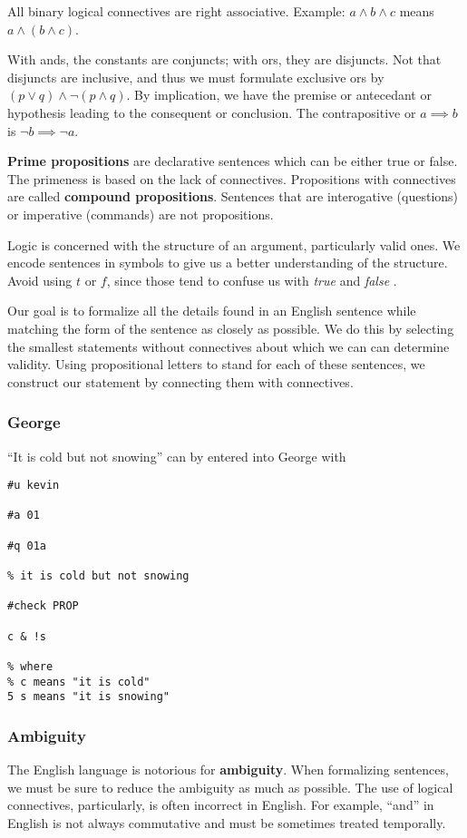\documentclass[12pt]{article}
\begin{document}
All binary logical connectives are right associative. Example: $a \land b \land c$ means $a \land (b \land c)$.

With ands, the constants are conjuncts; with ors, they are disjuncts. Not that disjuncts are inclusive, and thus we must formulate exclusive ors by $(p \lor q) \land \neg (p \land q)$. By implication, we have the premise or antecedant or hypothesis leading to the consequent or conclusion. The contrapositive or $a \implies b$ is $\neg b \implies \neg a$.

{\bf Prime propositions} are declarative sentences which can be either true or false. The primeness is based on the lack of connectives. Propositions with connectives are called {\bf compound propositions}. Sentences that are interogative (questions) or imperative (commands) are not propositions.

Logic is concerned with the structure of an argument, particularly valid ones. We encode sentences in symbols to give us a better understanding of the structure. Avoid using $t$ or $f$, since those tend to confuse us with \emph{true} and \emph{false} .

Our goal is to formalize all the details found in an English sentence while matching the form of the sentence as closely as possible. We do this by selecting the smallest statements without connectives about which we can can determine validity. Using propositional letters to stand for each of these sentences, we construct our statement by connecting them with connectives.

\subsubsection*{George}
``It is cold but not snowing'' can by entered into George with

\begin{verbatim}
#u kevin

#a 01

#q 01a

% it is cold but not snowing

#check PROP

c & !s

% where
% c means "it is cold"
5 s means "it is snowing"
\end{verbatim}

\subsubsection*{Ambiguity}
The English language is notorious for {\bf ambiguity}. When formalizing sentences, we must be sure to reduce the ambiguity as much as possible. The use of logical connectives, particularly, is often incorrect in English. For example, ``and'' in English is not always commutative and must be sometimes treated temporally.
\end{document}
